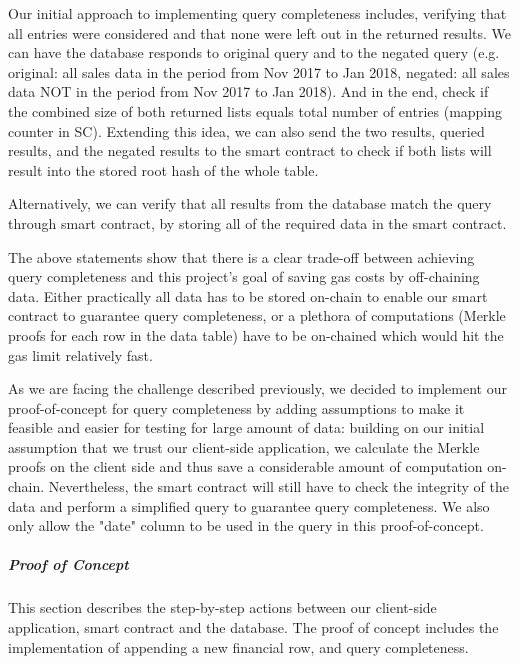 Our initial approach to implementing query completeness includes, verifying that all entries were considered and that none were left out in the returned results. We can have the database responds to original query and to the negated query (e.g. original: all sales data in the period from Nov 2017 to Jan 2018, negated: all sales data NOT in the period from Nov 2017 to Jan 2018). And in the end, check if the combined size of both returned lists equals total number of entries (mapping counter in SC). Extending this idea, we can also send the two results, queried results, and the negated results to the smart contract to check if both lists will result into the stored root hash of the whole table.

Alternatively, we can verify that all results from the database match the query through smart contract, by storing all of the required data in the smart contract. 

The above statements show that there is a clear trade-off between achieving query completeness and this project’s goal of saving gas costs by off-chaining data. Either practically all data has to be stored on-chain to enable our smart contract to guarantee query completeness, or a plethora of computations (Merkle proofs for each row in the data table) have to be on-chained which would hit the gas limit relatively fast.

As we are facing the challenge described previously, we decided to implement our proof-of-concept for query completeness by adding assumptions to make it feasible and easier for testing for large amount of data: building on our initial assumption that we trust our client-side application, we calculate the Merkle proofs on the client side and thus save a considerable amount of computation on-chain. Nevertheless, the smart contract will still have to check the integrity of the data and perform a simplified query to guarantee query completeness. We also only allow the "date" column to be used in the query in this proof-of-concept.

\subparagraph{Proof of Concept}

This section describes the step-by-step actions between our client-side application, smart contract and the database. The proof of concept includes the implementation of appending a new financial row, and query completeness.

